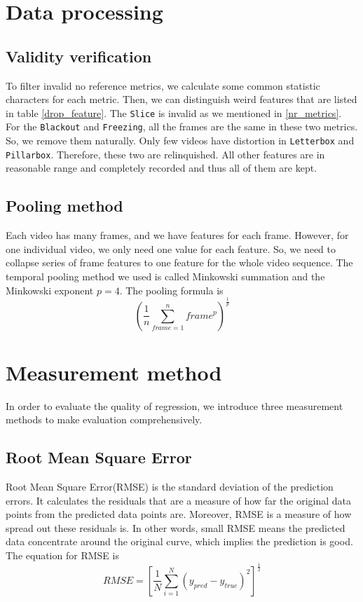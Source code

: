 \documentclass[10pt,conference,compsocconf]{IEEEtran}
\begin{document}
\section{Data processing}
\subsection{Validity verification}
To filter invalid no reference metrics, we calculate some common statistic characters for each metric. Then, we can distinguish weird features that are listed in table \ref{drop_feature}. The \texttt{Slice} is invalid as we mentioned in \ref{nr_metrics}. For the \texttt{Blackout} and \texttt{Freezing}, all the frames are the same in these two metrics. So, we remove them naturally. Only few videos have distortion in \texttt{Letterbox} and \texttt{Pillarbox}. Therefore, these two are relinquished. All other features are in reasonable range and completely recorded and thus all of them are kept.
\subsection{Pooling method}
Each video has many frames, and we have features for each frame. However, for one individual video, we only need one value for each feature. So, we need to collapse series of frame features to one feature for the whole video sequence. The temporal pooling method we used is called Minkowski summation and the Minkowski exponent $p = 4$. The pooling formula is
\begin{equation}
(\frac{1}{n}\sum_{frame = 1}^{n} frame^{p})^{\frac{1}{p}}
\end{equation}


\section{Measurement method}
In order to evaluate the quality of regression, we introduce three measurement methods to make evaluation comprehensively.
\subsection{Root Mean Square Error}
Root Mean Square Error(RMSE) is the standard deviation of the prediction errors. It calculates the residuals that are a measure of how far the original data points from the predicted data points are. Moreover, RMSE is a measure of how spread out these residuals is. In other words, small RMSE means the predicted data concentrate around the original curve, which implies the prediction is good. The equation for RMSE is
\begin{equation}
RMSE = [\frac{1}{N}\sum_{i=1}^{N}(y_{pred} - y_{true})^2]^{\frac{1}{2}}    
\end{equation}
\end{document}

